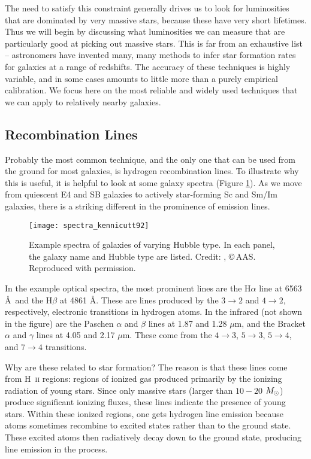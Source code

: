 The need to satisfy this constraint generally drives us to look for luminosities that are dominated by very massive stars, because these have very short lifetimes. Thus we will begin by discussing what luminosities we can measure that are particularly good at picking out massive stars. This is far from an exhaustive list -- astronomers have invented many, many methods to infer star formation rates for galaxies at a range of redshifts. The accuracy of these techniques is highly variable, and in some cases amounts to little more than a purely empirical calibration. We focus here on the most reliable and widely used techniques that we can apply to relatively nearby galaxies.

\subsection{Recombination Lines}

Probably the most common technique, and the only one that can be used from the ground for most galaxies, is hydrogen recombination lines. To illustrate why this is useful, it is helpful to look at some galaxy spectra (Figure \ref{fig:spectra_kennicutt92}). As we move from quiescent E4 and SB galaxies to actively star-forming Sc and Sm/Im galaxies, there is a striking different in the prominence of emission lines.

\begin{figure}
\texttt{[image: spectra\_kennicutt92]}
\caption[Optical spectra of galaxies across the Hubble sequence]{
\label{fig:spectra_kennicutt92}
Example spectra of galaxies of varying Hubble type. In each panel, the galaxy name and Hubble type are listed. Credit: \citet{kennicutt92a}, \copyright\,AAS. Reproduced with permission.
}
\end{figure}

In the example optical spectra, the most prominent lines are the H$\alpha$ line at 6563 \AA\ and the H$\beta$ at 4861 \AA. These are lines produced by the $3\rightarrow 2$ and $4\rightarrow 2$, respectively, electronic transitions in hydrogen atoms. In the infrared (not shown in the figure) are the Paschen $\alpha$ and $\beta$ lines at 1.87 and 1.28 $\mu$m, and the Bracket $\alpha$ and $\gamma$ lines at 4.05 and 2.17 $\mu$m. These come from the $4\rightarrow 3$, $5\rightarrow 3$, $5\rightarrow 4$, and $7\rightarrow 4$ transitions.

Why are these related to star formation? The reason is that these lines come from H~\textsc{ii} regions: regions of ionized gas produced primarily by the ionizing radiation of young stars. Since only massive stars (larger than $10-20$ $M_{\odot}$) produce significant ionizing fluxes, these lines indicate the presence of young stars. Within these ionized regions, one gets hydrogen line emission because atoms sometimes recombine to excited states rather than to the ground state. These excited atoms then radiatively decay down to the ground state, producing line emission in the process.

